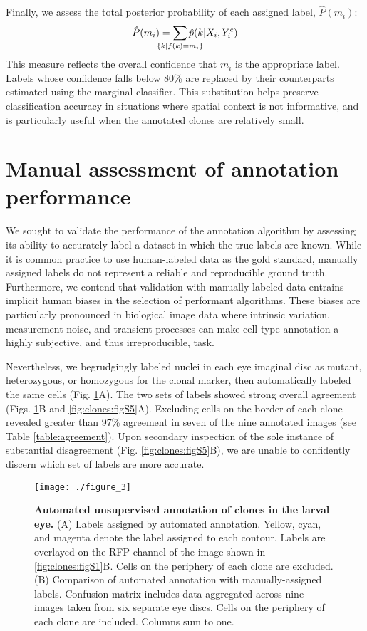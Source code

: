 Finally, we assess the total posterior probability of each assigned label, $\hat{P}(m_i)$:
\begin{equation}
\hat{P}(m_i) = \sum_{ \mathclap{ \{ k | f(k)=m_i \}} } \hat{p}(k | X_i,Y^c_i)
\end{equation}
This measure reflects the overall confidence that $m_i$ is the appropriate label. Labels whose confidence falls below 80\% are replaced by their counterparts estimated using the marginal classifier. This substitution helps preserve classification accuracy in situations where spatial context is not informative, and is particularly useful when the annotated clones are relatively small.

\section{Manual assessment of annotation performance}

We sought to validate the performance of the annotation algorithm by assessing its ability to accurately label a dataset in which the true labels are known. While it is common practice to use human-labeled data as the gold standard, manually assigned labels do not represent a reliable and reproducible ground truth. Furthermore, we contend that validation with manually-labeled data entrains implicit human biases in the selection of performant algorithms. These biases are particularly pronounced in biological image data where intrinsic variation, measurement noise, and transient processes can make cell-type annotation a highly subjective, and thus irreproducible, task. 

Nevertheless, we begrudgingly labeled nuclei in each eye imaginal disc as mutant, heterozygous, or homozygous for the clonal marker, then automatically labeled the same cells (Fig. \ref{fig:clones:fig3}A). The two sets of labels showed strong overall agreement (Figs. \ref{fig:clones:fig3}B and \ref{fig:clones:figS5}A). Excluding cells on the border of each clone revealed greater than 97\% agreement in seven of the nine annotated images (see Table \ref{table:agreement}). Upon secondary inspection of the sole instance of substantial disagreement (Fig. \ref{fig:clones:figS5}B), we are unable to confidently discern which set of labels are more accurate.

\begin{figure}[t]
\centering
\texttt{[image: ./figure\_3]}
\caption[Automated unsupervised annotation of clones in the larval eye.]{\textbf{Automated unsupervised annotation of clones in the larval eye.} (A) Labels assigned by automated annotation. Yellow, cyan, and magenta denote the label assigned to each contour. Labels are overlayed on the RFP channel of the image shown in \ref{fig:clones:figS1}B. Cells on the periphery of each clone are excluded. (B) Comparison of automated annotation with manually-assigned labels. Confusion matrix includes data aggregated across nine images taken from six separate eye discs. Cells on the periphery of each clone are included. Columns sum to one.}
\label{fig:clones:fig3}
\end{figure}

